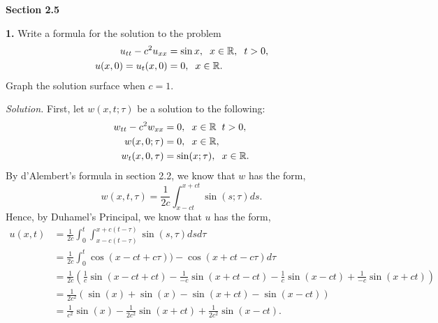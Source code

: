 \documentclass{article}
\begin{document}
\setlength{\parindent}{0cm}   %



\textbf{Section 2.5}

\textbf{1.}  Write a formula for the solution to the problem
\begin{align*}
u_{tt}-c^2u_{xx} &= \sin x,  \hspace{2mm} x\in \mathbb{R}, \hspace{2mm} t>0, \\
u(x,0) = u_t(x,0) &= 0, \hspace{2mm} x\in \mathbb{R}.
\end{align*}
Graph the solution surface when \(c=1\). 


\vspace{3mm}
\textit{Solution.} First, let \(w(x,t;\tau) \) be a solution to the following: 
\begin{align*}
 w_{tt} - c^2w_{xx} &= 0 , \hspace{2mm} x \in \mathbb{R} \hspace{2mm} t>0, \\
 w(x,0;\tau) &=0, \hspace{2mm} x \in \mathbb{R}, \\
 w_t(x,0,\tau) &= \sin(x;\tau), \hspace{2mm} x \in \mathbb{R}.
\end{align*}
By d'Alembert's formula in section 2.2, we know that \(w\) has the form, 
\[
w(x,t,\tau) = \frac{1}{2c} \int_{x-ct}^{x+ct} \sin(s;\tau) ds. 
\]
Hence, by Duhamel's Principal, we know that \(u\) has the form, 
\begin{align*}
u(x,t) &= \frac{1}{2c} \int_0^t \int_{x-c(t-\tau)}^{x+c(t-\tau)} \sin(s,\tau) ds d\tau \\
&= \frac{1}{2c} \int_0^t \cos(x-ct+c\tau)) - \cos(x+ct -c\tau)   d\tau  \\
&= \frac{1}{2c} \left( \frac{1}{c} \sin(x-ct+ct) -  \frac{1}{-c}   \sin(x+ct-ct) -  \frac{1}{c}\sin(x-ct) +\frac{1}{-c} \sin(x+ct)  \right) \\
&= \frac{1}{2c^2} ( \sin(x) + \sin(x) - \sin(x+ct) -\sin(x-ct) ) \\
&= \frac{1}{c^2} \sin(x) - \frac{1}{2c^2} \sin(x+ct)+  \frac{1}{2c^2} \sin(x-ct).
\end{align*}
\end{document}
